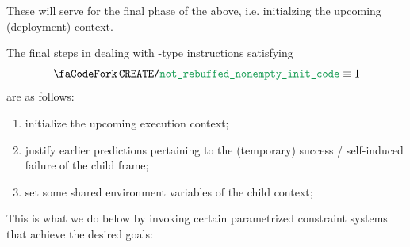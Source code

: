 These will serve for the final phase of the above, i.e. initialzing the upcoming (deployment) context.

The final steps in dealing with -type instructions satisfying
\[
	\scenCreateExecutionNonEmptyInitCode \equiv 1
\]
are as follows:
\begin{enumerate}
        \item initialize the upcoming execution context;
	\item justify earlier predictions pertaining to the (temporary) success / self-induced failure of the child frame;
	\item set some shared environment variables of the child context;
\end{enumerate}
This is what we do below by invoking certain parametrized constraint systems that achieve the desired goals:
